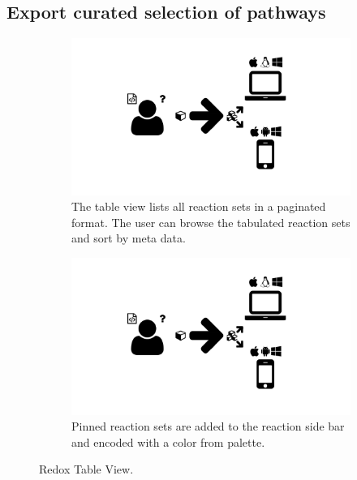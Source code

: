 \subsection{Export curated selection of pathways}

\begin{figure}
  \centering
  \begin{subfigure}[b]{\textwidth}
    \includegraphics[width=\textwidth,page=5,trim=0.37cm 3.65cm 13.1cm 3.3cm, clip=true]{images/Figures.pdf}
    \caption{The table view lists all reaction sets in a paginated format.
      The user can browse the tabulated reaction sets and sort by meta data.}
    \label{Figure:redox-table-view}
  \end{subfigure}
  \begin{subfigure}[b]{\textwidth}
    \includegraphics[width=\textwidth,page=5,trim=13.1cm 3.65cm 0.37cm 3.3cm, clip=true]{images/Figures.pdf}
    \caption{Pinned reaction sets are added to the reaction side bar and encoded with a color from palette.}
    \label{Figure:redox-table-pinned}
  \end{subfigure}
  \caption{Redox Table View.}
  \label{Figure:redox-table}
\end{figure}

